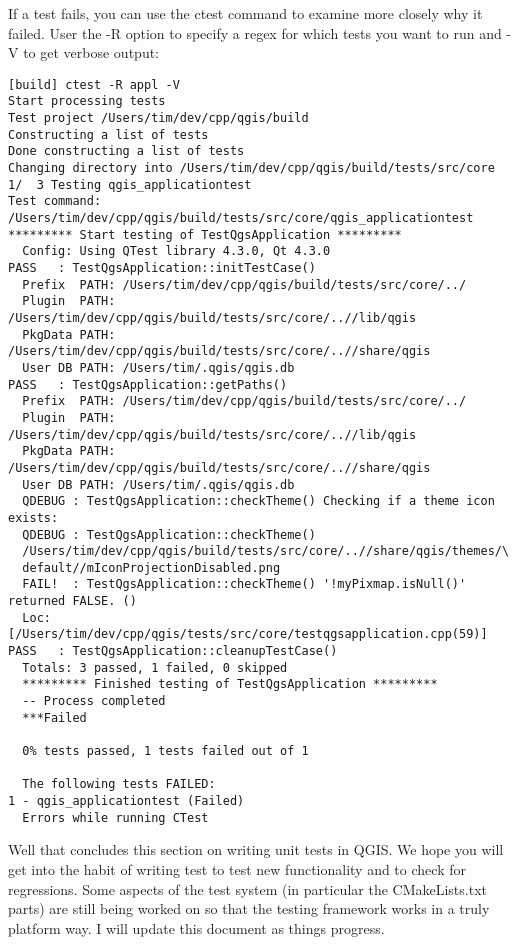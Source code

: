If a test fails, you can use the ctest command to examine more closely why it
failed. User the -R option to specify a regex for which tests you want to run
and -V to get verbose output:

\begin{verbatim}
[build] ctest -R appl -V
Start processing tests
Test project /Users/tim/dev/cpp/qgis/build
Constructing a list of tests
Done constructing a list of tests
Changing directory into /Users/tim/dev/cpp/qgis/build/tests/src/core
1/  3 Testing qgis_applicationtest          
Test command: /Users/tim/dev/cpp/qgis/build/tests/src/core/qgis_applicationtest
********* Start testing of TestQgsApplication *********
  Config: Using QTest library 4.3.0, Qt 4.3.0
PASS   : TestQgsApplication::initTestCase()
  Prefix  PATH: /Users/tim/dev/cpp/qgis/build/tests/src/core/../
  Plugin  PATH: /Users/tim/dev/cpp/qgis/build/tests/src/core/..//lib/qgis
  PkgData PATH: /Users/tim/dev/cpp/qgis/build/tests/src/core/..//share/qgis
  User DB PATH: /Users/tim/.qgis/qgis.db
PASS   : TestQgsApplication::getPaths()
  Prefix  PATH: /Users/tim/dev/cpp/qgis/build/tests/src/core/../
  Plugin  PATH: /Users/tim/dev/cpp/qgis/build/tests/src/core/..//lib/qgis
  PkgData PATH: /Users/tim/dev/cpp/qgis/build/tests/src/core/..//share/qgis
  User DB PATH: /Users/tim/.qgis/qgis.db
  QDEBUG : TestQgsApplication::checkTheme() Checking if a theme icon exists:
  QDEBUG : TestQgsApplication::checkTheme() 
  /Users/tim/dev/cpp/qgis/build/tests/src/core/..//share/qgis/themes/\
  default//mIconProjectionDisabled.png
  FAIL!  : TestQgsApplication::checkTheme() '!myPixmap.isNull()' returned FALSE. ()
  Loc: [/Users/tim/dev/cpp/qgis/tests/src/core/testqgsapplication.cpp(59)]
PASS   : TestQgsApplication::cleanupTestCase()
  Totals: 3 passed, 1 failed, 0 skipped
  ********* Finished testing of TestQgsApplication *********
  -- Process completed
  ***Failed

  0% tests passed, 1 tests failed out of 1

  The following tests FAILED:
1 - qgis_applicationtest (Failed)
  Errors while running CTest

\end{verbatim}

Well that concludes this section on writing unit tests in QGIS. We hope you
will get into the habit of writing test to test new functionality and to check
for regressions. Some aspects of the test system (in particular the
CMakeLists.txt parts) are still being worked on so that the testing framework
works in a truly platform way. I will update this document as things
progress.


